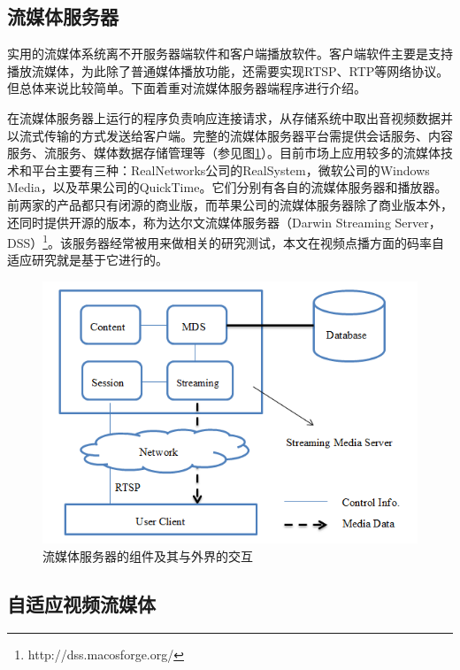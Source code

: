 \subsection{流媒体服务器}

实用的流媒体系统离不开服务器端软件和客户端播放软件。客户端软件主要是支持播放流媒体，为此除了普通媒体播放功能，还需要实现RTSP、RTP等网络协议。但总体来说比较简单。下面着重对流媒体服务器端程序进行介绍。

在流媒体服务器上运行的程序负责响应连接请求，从存储系统中取出音视频数据并以流式传输的方式发送给客户端。完整的流媒体服务器平台需提供会话服务、内容服务、流服务、媒体数据存储管理等（参见图\ref{fig:11}）。目前市场上应用较多的流媒体技术和平台主要有三种：RealNetworks公司的RealSystem，微软公司的Windows Media，以及苹果公司的QuickTime。它们分别有各自的流媒体服务器和播放器。前两家的产品都只有闭源的商业版，而苹果公司的流媒体服务器除了商业版本外，还同时提供开源的版本，称为达尔文流媒体服务器（Darwin Streaming Server，DSS）\footnote{http://dss.macosforge.org/}。该服务器经常被用来做相关的研究测试\supercite{Huang2004}，本文在视频点播方面的码率自适应研究就是基于它进行的。

\begin{figure}[h]
	\centering
	\includegraphics[width = 0.9\linewidth]{clip/11.png}
	\caption{流媒体服务器的组件及其与外界的交互\label{fig:11}}
\end{figure}

\subsection{自适应视频流媒体}

